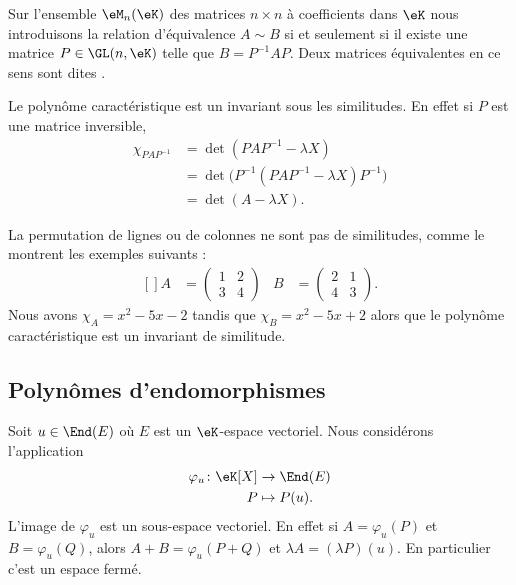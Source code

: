 Sur l'ensemble \( \eM_n(\eK)\) des matrices \( n\times n\) à coefficients dans \(\eK\) nous introduisons la relation d'équivalence \( A\sim B\) si et seulement si il existe une matrice \( P\in\GL(n,\eK)\) telle que \( B=P^{-1}AP\). Deux matrices équivalentes en ce sens sont dites .

Le polynôme caractéristique est un invariant sous les similitudes. En effet si \( P\) est une matrice inversible,
\begin{subequations}
    \begin{align}
        \chi_{PAP^{-1}}&=\det(PAP^{-1}-\lambda X)\\
        &=\det\big( P^{-1}(PAP^{-1}-\lambda X)P^{-1} \big)\\
        &=\det(A-\lambda X).
    \end{align}
\end{subequations}

La permutation de lignes ou de colonnes ne sont pas de similitudes, comme le montrent les exemples suivants :
\begin{equation}
    \begin{aligned}[]
        A&=\begin{pmatrix}
            1    &   2    \\ 
            3    &   4    
        \end{pmatrix}&
        B&=\begin{pmatrix}
            2    &   1    \\ 
            4    &   3    
        \end{pmatrix}.
    \end{aligned}
\end{equation}
Nous avons \( \chi_A=x^2-5x-2\) tandis que \( \chi_B=x^2-5x+2\) alors que le polynôme caractéristique est un invariant de similitude.

\subsection{Polynômes d'endomorphismes}

Soit \( u\in\End(E)\) où \( E\) est un \( \eK\)-espace vectoriel. Nous considérons l'application
\begin{equation}
    \begin{aligned}
        \varphi_u\colon \eK[X]&\to \End(E) \\
        P&\mapsto P(u). 
    \end{aligned}
\end{equation}
L'image de \( \varphi_u\) est un sous-espace vectoriel. En effet si \( A=\varphi_u(P)\) et \( B=\varphi_u(Q)\), alors \( A+B=\varphi_u(P+Q)\) et \( \lambda A=(\lambda P)(u)\). En particulier c'est un espace fermé.




